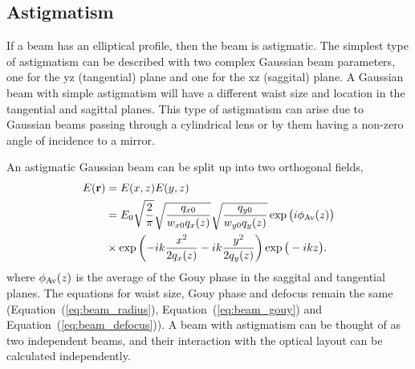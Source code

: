 \subsection{Astigmatism}
If a beam has an elliptical profile, then the beam is astigmatic. The simplest type of astigmatism can be described with two complex Gaussian beam parameters, one for the yz (tangential) plane and one for the xz (saggital) plane. A Gaussian beam with simple astigmatism will have a different waist size and location in the tangential and sagittal planes. This type of astigmatism can arise due to Gaussian beams passing through a cylindrical lens or by them having a non-zero angle of incidence to a mirror. 
\par
An astigmatic Gaussian beam can be split up into two orthogonal fields,
\begin{align}
E(\mathbf{r}) &= E(x,z)E(y,z) \nonumber\\ &= E_0\sqrt{\frac{2}{\pi}} \sqrt{\frac{q_{x0}}{w_{x0}q_{x}(z)}}\sqrt{\frac{q_{y0}}{w_{y0}q_{y}(z)}} \exp\big(i\phi_{\rm{Av}}(z)\big) \nonumber\\ &\times\exp\left( -ik\frac{x^2}{2q_{x}(z)} -ik\frac{y^2}{2q_{y}(z)}\right)\exp\big(-ikz\big).
\end{align}
where $\phi_{\rm{Av}}(z)$ is the average of the Gouy phase in the saggital and tangential planes. The equations for waist size, Gouy phase and defocus remain the same (Equation~(\ref{eq:beam_radius}), Equation~(\ref{eq:beam_gouy}) and Equation~(\ref{eq:beam_defocus})). A beam with astigmatism can be thought of as two independent beams, and their interaction with the optical layout can be calculated independently.
